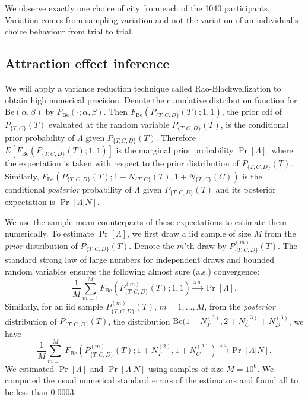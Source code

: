 \documentclass[11pt,letter]{article}
\begin{document}
We observe exactly one choice of city from each of the 1040 participants.
Variation comes from sampling variation and not the variation of an individual's choice behaviour from trial to trial.

\subsection{Attraction effect inference}

We will apply a variance reduction technique called Rao-Blackwellization to obtain high numerical precision.
Denote the cumulative distribution function for $\mathrm{Be}(\alpha, \beta)$ by $F_{\mathrm{Be}}(\cdot;\alpha, \beta)$.
Then $F_{\mathrm{Be}}(P_{\{T,C,D\}}(T); 1, 1)$, the prior cdf of $P_{\{T,C\}}(T)$ evaluated at the random variable $P_{\{T,C,D\}}(T)$, is the conditional prior probability of $\Lambda$ given $P_{\{T,C,D\}}(T)$.
Therefore $E[F_{\mathrm{Be}}(P_{\{T,C,D\}}(T); 1, 1)]$ is the marginal prior probability $\Pr[\Lambda]$, where the expectation is taken with respect to the prior distribution of $P_{\{T,C,D\}}(T)$.
Similarly, $F_{\mathrm{Be}}(P_{\{T,C,D\}}(T); 1 + N_{\{T,C\}}(T), 1 + N_{\{T,C\}}(C))$ is the conditional {\em posterior} probability of $\Lambda$ given $P_{\{T,C,D\}}(T)$ and its posterior expectation is $\Pr[\Lambda|N]$.

We use the sample mean counterparts of these expectations to estimate them numerically.
To estimate $\Pr[\Lambda]$, we first draw a iid sample of size $M$ from the {\em prior} distribution of $P_{\{T,C,D\}}(T)$.
Denote the $m$'th draw by $P^{(m)}_{\{T,C,D\}}(T)$.
The standard strong law of large numbers for independent draws and bounded random variables ensures the following almost sure (a.s.) convergence:
\[
  \frac{1}{M} \sum_{m=1}^M F_{\mathrm{Be}}(P^{(m)}_{\{T,C,D\}}(T); 1, 1)
  \overset{\text{a.s.}}{\longrightarrow} \Pr[\Lambda].
\]
Similarly, for an iid sample $P^{(m)}_{\{T,C,D\}}(T)$, $m=1,\ldots,M$, from the {\em posterior} distribution of $P_{\{T,C,D\}}(T)$, the distribution $\mathrm{Be}(1 + N_T^{(3)}, 2 + N_C^{(3)} + N_D^{(3)}$, we have 
\[
  \frac{1}{M} \sum_{m=1}^M F_{\mathrm{Be}}(P^{(m)}_{\{T,C,D\}}(T);
  1 + N_T^{(2)}, 1 + N_C^{(2)})
  \overset{\text{a.s.}}{\longrightarrow} \Pr[\Lambda|N].
\]
We estimated $\Pr[\Lambda]$ and $\Pr[\Lambda|N]$ using samples of size $M = 10^6$.
We computed the usual numerical standard errors of the estimators and found all to be less than 0.0003.

\fi



\end{document}
